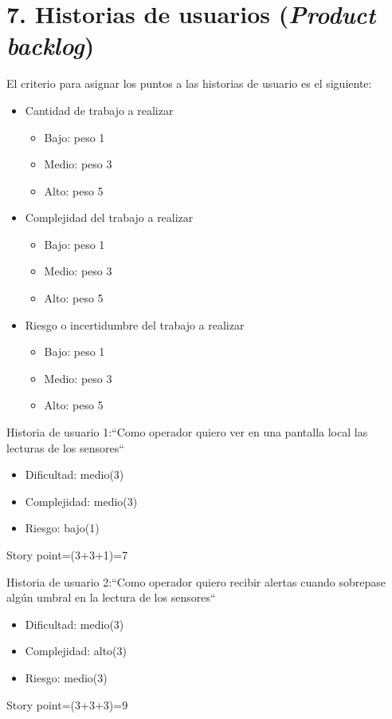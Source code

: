 \documentclass[
11pt, %
codirector, %
]{charter}
\begin{document}
\begin{enumerate}
\end{enumerate}

\section{7. Historias de usuarios (\textit{Product backlog})}
\label{sec:backlog}

El criterio para asignar los puntos a las historias de usuario es el siguiente:
\begin{itemize}
	\item Cantidad de trabajo a realizar 
	\begin{itemize}
		\item Bajo: peso 1
		\item Medio: peso 3
		\item Alto: peso 5 
	\end{itemize}
	\item Complejidad del trabajo a realizar
	\begin{itemize}
		\item Bajo: peso 1
		\item Medio: peso 3
		\item Alto: peso 5  
	\end{itemize}
	\item Riesgo o incertidumbre del trabajo a realizar
	\begin{itemize}
		\item Bajo: peso 1
		\item Medio: peso 3
		\item Alto: peso 5  
	\end{itemize}
\end{itemize}

Historia de usuario 1:``Como operador quiero ver en una pantalla local las lecturas de los sensores``
\begin{itemize}
	\item Dificultad: medio(3) 
	\item Complejidad: medio(3)
	\item Riesgo: bajo(1)  
\end{itemize}
Story point=(3+3+1)=7

Historia de usuario 2:``Como operador quiero recibir alertas cuando sobrepase algún umbral en la lectura de los sensores``
\begin{itemize}
	\item Dificultad: medio(3) 
	\item Complejidad: alto(3)
	\item Riesgo: medio(3)
\end{itemize}
Story point=(3+3+3)=9
\end{document}
